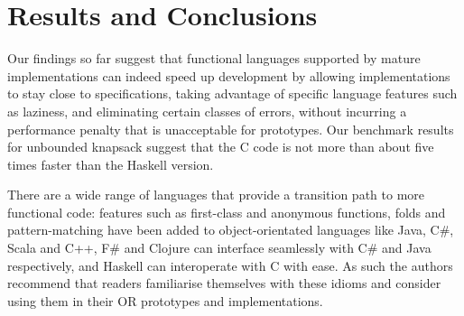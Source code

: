 \section{Results and Conclusions}

Our findings so far suggest that functional languages supported by mature
implementations can indeed speed up development by allowing implementations to
stay close to specifications, taking advantage of specific language features
such as laziness, and eliminating certain classes of errors, without incurring
a performance penalty that is unacceptable for prototypes. Our
benchmark results for unbounded knapsack suggest that the C
code is not more than about five times faster than the Haskell version.

There are a wide range of languages that provide a transition path to more functional code: features such as first-class and anonymous functions, folds and pattern-matching have been added to object-orientated languages like Java, C\#, Scala and C++, F\# and Clojure can interface seamlessly with C\# and Java respectively, and Haskell can interoperate with C with ease. As such the authors recommend that readers familiarise themselves with these idioms and consider using them in their OR prototypes and implementations.
